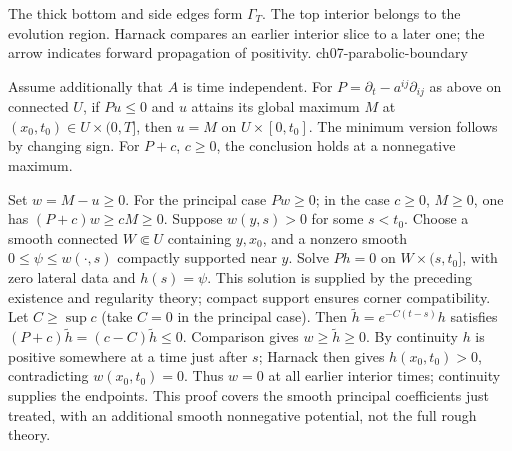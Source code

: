 \Needspace{55mm}

{The thick bottom and side edges form $\Gamma_T$. The top interior belongs to the evolution region. Harnack compares an earlier interior slice to a later one; the arrow indicates forward propagation of positivity.}
{ch07-parabolic-boundary}

\Needspace{55mm}
\begin{theorem}
Assume additionally that $A$ is time independent. For
$P=\partial_t-a^{ij}\partial_{ij}$ as above on connected $U$, if
$Pu\leq0$ and $u$ attains its global maximum $M$ at
$(x_0,t_0)\in U\times(0,T]$, then $u=M$ on $U\times[0,t_0]$.
The minimum version follows by changing sign. For $P+c$, $c\geq0$,
the conclusion holds at a nonnegative maximum.
\end{theorem}
\begin{expandedproof}
Set $w=M-u\geq0$. For the principal case $Pw\geq0$; in the case
$c\geq0$, $M\geq0$, one has $(P+c)w\geq cM\geq0$.
Suppose $w(y,s)>0$ for some $s<t_0$. Choose a smooth connected
$W\Subset U$ containing $y,x_0$, and a nonzero smooth
$0\leq\psi\leq w(\cdot,s)$ compactly supported near $y$.
Solve $Ph=0$ on $W\times(s,t_0]$, with zero lateral data and
$h(s)=\psi$. This solution is supplied by the preceding existence and
regularity theory; compact support ensures corner compatibility.
Let $C\geq\sup c$ (take $C=0$ in the principal case).
Then $\widetilde h=e^{-C(t-s)}h$ satisfies
$(P+c)\widetilde h=(c-C)\widetilde h\leq0$.
Comparison gives $w\geq\widetilde h\geq0$.
By continuity $h$ is positive somewhere at a time just after $s$;
Harnack then gives $h(x_0,t_0)>0$, contradicting $w(x_0,t_0)=0$.
Thus $w=0$ at all earlier interior times; continuity supplies the endpoints.
This proof covers the smooth principal coefficients just treated, with
an additional smooth nonnegative potential, not the full rough theory.
\end{expandedproof}
\Needspace{55mm}
